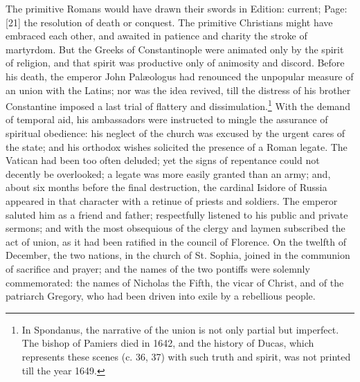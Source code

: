 The primitive Romans would have drawn their swords in Edition: current; Page: [21] the resolution of death or conquest. The primitive Christians might have embraced each other, and awaited in patience and charity the stroke of martyrdom. But the Greeks of Constantinople were animated only by the spirit of religion, and that spirit was productive only of animosity and discord. Before his death, the emperor John Palæologus had renounced the unpopular measure of an union with the Latins; nor was the idea revived, till the distress of his brother Constantine imposed a last trial of flattery and dissimulation.\footnote{In Spondanus, the narrative of the union is not only partial but imperfect. The bishop of Pamiers died in 1642, and the history of Ducas, which represents these scenes (c. 36, 37) with such truth and spirit, was not printed till the year 1649.} With the demand of temporal aid, his ambassadors were instructed to mingle the assurance of spiritual obedience: his neglect of the church was excused by the urgent cares of the state; and his orthodox wishes solicited the presence of a Roman legate. The Vatican had been too often deluded; yet the signs of repentance could not decently be overlooked; a legate was more easily granted than an army; and, about six months before the final destruction, the cardinal Isidore of Russia appeared in that character with a retinue of priests and soldiers. The emperor saluted him as a friend and father; respectfully listened to his public and private sermons; and with the most obsequious of the clergy and laymen subscribed the act of union, as it had been ratified in the council of Florence. On the twelfth of December, the two nations, in the church of St. Sophia, joined in the communion of sacrifice and prayer; and the names of the two pontiffs were solemnly commemorated: the names of Nicholas the Fifth, the vicar of Christ, and of the patriarch Gregory, who had been driven into exile by a rebellious people.

